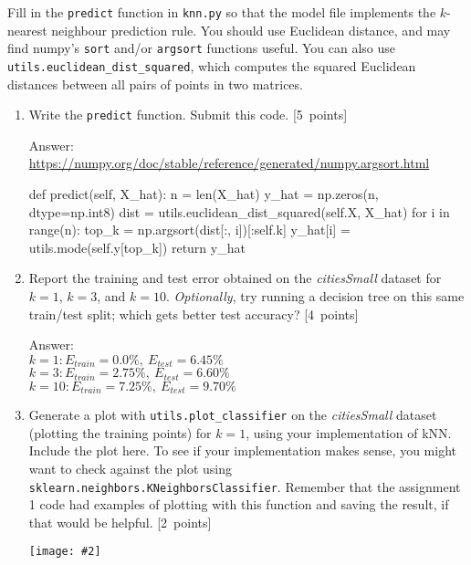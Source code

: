 \documentclass{article}
\newcommand{\blu}[1]{{\textcolor{blu}{#1}}}
\newenvironment{answer}{\par\begingroup\color{gre}Answer: }{\endgroup}
\let\ask\blu
\newcommand\pts[1]{\textcolor{pointscolour}{[#1~points]}}
\newcommand{\centerfig}[2]{\begin{center}\texttt{[image: \#2]}\end{center}}
\begin{document}
    Fill in the \texttt{predict} function in \texttt{knn.py} so that the model file implements the $k$-nearest neighbour prediction rule.
    You should use Euclidean distance, and may find numpy's \texttt{sort} and/or \texttt{argsort} functions useful.
    You can also use \texttt{utils.euclidean\string_dist\string_squared}, which computes the squared Euclidean distances between all pairs of points in two matrices.
    \begin{enumerate}
        \item Write the \texttt{predict} function. \ask{Submit this code.} \pts{5}
        \begin{answer}
            \url{https://numpy.org/doc/stable/reference/generated/numpy.argsort.html}
        \end{answer}
        \begin{python}
def predict(self, X_hat):
    n = len(X_hat)
    y_hat = np.zeros(n, dtype=np.int8)
    dist = utils.euclidean_dist_squared(self.X, X_hat)
    for i in range(n):
        top_k = np.argsort(dist[:, i])[:self.k]
        y_hat[i] = utils.mode(self.y[top_k])
    return y_hat
        \end{python}

        \item \ask{Report the training and test error} obtained on the \emph{citiesSmall} dataset for $k=1$, $k=3$, and $k=10$. \emph{Optionally}, try running a decision tree on this same train/test split; which gets better test accuracy? \pts{4}
        \begin{answer}
            \\
            $k=1: E_{train} = 0.0\%,\: E_{test} = 6.45\%$\\
            $k=3: E_{train} = 2.75\%,\: E_{test} = 6.60\%$\\
            $k=10: E_{train} = 7.25\%,\: E_{test} = 9.70\%$
        \end{answer}

        \item Generate a plot with \texttt{utils.plot\_classifier} on the \emph{citiesSmall} dataset (plotting the training points) for $k=1$, using your implementation of kNN. \ask{Include the plot here.} To see if your implementation makes sense, you might want to check against the plot using \texttt{sklearn.neighbors.KNeighborsClassifier}.  Remember that the assignment 1 code had examples of plotting with this function and saving the result, if that would be helpful. \pts{2}
            \centerfig{0.65}{figs/1_kNN}


\end{enumerate}
\end{document}
